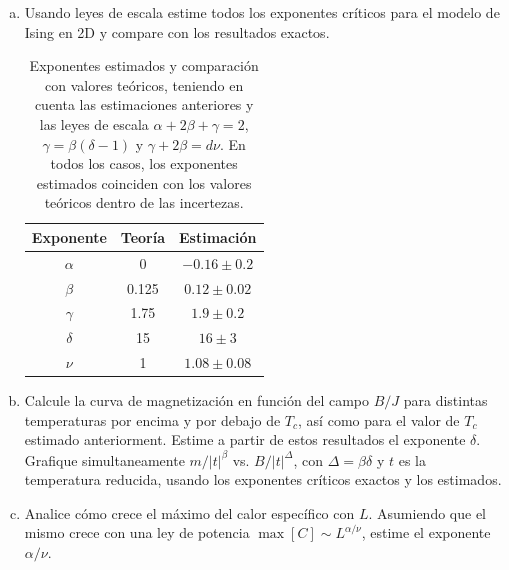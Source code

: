 \documentclass[10pt]{article}
\begin{document}
\begin{enumerate}[a)]
\pagebreak

\item Usando leyes de escala estime todos los exponentes críticos para el modelo de Ising en 2D y compare con los resultados exactos.

\begin{table}[ht]
\centering
\begin{tabular}{c|c|c}
 Exponente & Teoría & Estimación  \\ \hline
 $\alpha$  & 0 & $-0.16\pm 0.2$  \\
 $\beta$  & 0.125 &  $0.12\pm 0.02$ \\
 $\gamma$ & 1.75 &  $1.9\pm 0.2$ \\
 $\delta$  & 15 &  $ 16\pm 3$ \\
 $\nu$ & 1 & $1.08\pm 0.08$
\end{tabular}
\caption{Exponentes estimados y comparación con valores teóricos, teniendo en cuenta las estimaciones anteriores y las leyes de escala $\alpha + 2\beta + \gamma = 2$, $\gamma = \beta (\delta - 1)$ y $\gamma + 2\beta = d\nu$. En todos los casos, los exponentes estimados coinciden con los valores teóricos dentro de las incertezas.}
\end{table}


\pagebreak

\item Calcule la curva de magnetización en función del campo $B/J$ para distintas temperaturas por encima y por debajo de $T_c$, así como para el valor de $T_c$ estimado anteriorment. Estime a partir de estos resultados el exponente $\delta$. Grafique simultaneamente $m/|t|^{\beta}$ vs. $B/|t|^{\Delta}$, con $\Delta = \beta \delta$ y $t$ es la temperatura reducida, usando los exponentes críticos exactos y los estimados. 

\pagebreak

\item Analice cómo crece el máximo del calor específico con $L$. Asumiendo que el mismo crece con una ley de potencia $\max [C] \sim L^{\alpha/\nu}$, estime el exponente $\alpha / \nu$.



\end{enumerate}
\end{document}
